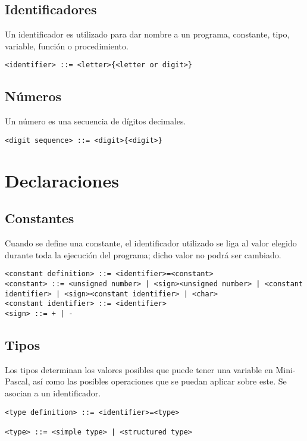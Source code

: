 \documentclass[a4paper,oneside]{report}
\begin{document}
\subsection{Identificadores}

Un identificador es utilizado para dar nombre a un programa, constante, tipo, variable, función o procedimiento.
\begin{verbatim}
<identifier> ::= <letter>{<letter or digit>}
\end{verbatim}

\subsection{Números}
Un número es una secuencia de dígitos decimales.
\begin{verbatim}
<digit sequence> ::= <digit>{<digit>}
\end{verbatim}

\section{Declaraciones}

\subsection{Constantes}
Cuando se define una constante, el identificador utilizado se liga al valor elegido durante toda la ejecución del programa; dicho valor no podrá ser cambiado.

\begin{verbatim}
<constant definition> ::= <identifier>=<constant>
<constant> ::= <unsigned number> | <sign><unsigned number> | <constant identifier> | <sign><constant identifier> | <char>
<constant identifier> ::= <identifier>
<sign> ::= + | -
\end{verbatim}

\subsection{Tipos}

Los tipos determinan los valores posibles que puede tener una variable en Mini-Pascal, así como las posibles operaciones que se puedan aplicar sobre este. Se asocian a un identificador.

\begin{verbatim}
<type definition> ::= <identifier>=<type>

<type> ::= <simple type> | <structured type>
\end{verbatim}
\end{document}
